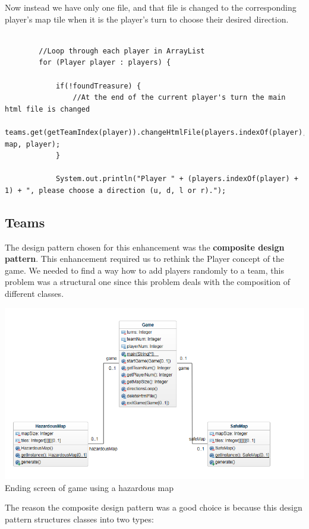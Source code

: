 \documentclass[a4paper,12pt]{extarticle}
\begin{document}
\noindent Now instead we have only one file, and that file is changed to the corresponding player's map tile when it is the player's turn to choose their desired direction.

\begin{lstlisting}
 
        //Loop through each player in ArrayList
        for (Player player : players) {

            if(!foundTreasure) {
                //At the end of the current player's turn the main html file is changed
                teams.get(getTeamIndex(player)).changeHtmlFile(players.indexOf(player), map, player);
            }

            System.out.println("Player " + (players.indexOf(player) + 1) + ", please choose a direction (u, d, l or r).");
\end{lstlisting}

\newpage
\subsection{Teams}
The design pattern chosen for this enhancement was the \textbf{composite design pattern}. This enhancement required us to rethink the Player concept of the game. We needed to find a way how to add players randomly to a team, this problem was a structural one since this problem deals with the composition of different classes.\\

\begin{center}
\includegraphics[scale=0.5]{Enhancement2CD.png}\\
Ending screen of game using a hazardous map
\end{center}

\noindent The reason the composite design pattern was a good choice is because this design pattern structures classes into two types:\\
\end{document}
